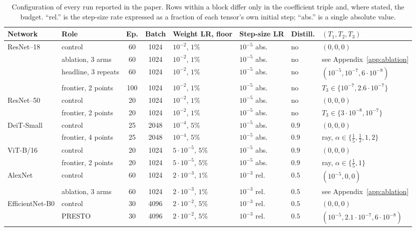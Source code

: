 \documentclass{article}
\begin{document}
\begin{table}[ht]
  \caption{Configuration of every run reported in the paper. Rows within a block
  differ only in the coefficient triple and, where stated, the budget. ``rel.''
  is the step-size rate expressed as a fraction of each tensor's own initial
  step; ``abs.'' is a single absolute value.}
  \label{tab:best-compression-hyperparameters}
  \centering \scriptsize
  \setlength{\tabcolsep}{3pt}\renewcommand{\arraystretch}{1.05}
  \begin{tabular}{llccllll}
    \toprule
    Network & Role & Ep. & Batch & Weight LR, floor & Step-size LR & Distill. & $(T_1,T_2,T_3)$ \\
    \midrule
    \multirow{4}{*}{ResNet--18}
      & control & 60 & 1024 & $10^{-2}$, $1\%$ & $10^{-5}$ abs. & no & $(0,0,0)$ \\
      & ablation, 3 arms & 60 & 1024 & $10^{-2}$, $1\%$ & $10^{-5}$ abs. & no & see Appendix~\ref{app:ablation} \\
      & headline, 3 repeats & 60 & 1024 & $10^{-2}$, $1\%$ & $10^{-5}$ abs. & no & $(10^{-5},10^{-7},6{\cdot}10^{-8})$ \\
      & frontier, 2 points & 100 & 1024 & $10^{-2}$, $1\%$ & $10^{-5}$ abs. & no & $T_3\in\{10^{-7},2.6{\cdot}10^{-7}\}$ \\
    \midrule
    \multirow{2}{*}{ResNet--50}
      & control & 20 & 1024 & $10^{-2}$, $1\%$ & $10^{-5}$ abs. & no & $(0,0,0)$ \\
      & frontier, 2 points & 20 & 1024 & $10^{-2}$, $1\%$ & $10^{-5}$ abs. & no & $T_3\in\{3{\cdot}10^{-8},10^{-7}\}$ \\
    \midrule
    \multirow{2}{*}{DeiT-Small}
      & control & 25 & 2048 & $10^{-4}$, $5\%$ & $10^{-5}$ abs. & $0.9$ & $(0,0,0)$ \\
      & frontier, 4 points & 25 & 2048 & $10^{-4}$, $5\%$ & $10^{-5}$ abs. & $0.9$ & ray, $\alpha\in\{\tfrac15,\tfrac12,1,2\}$ \\
    \midrule
    \multirow{2}{*}{ViT-B/16}
      & control & 20 & 1024 & $5{\cdot}10^{-5}$, $5\%$ & $10^{-5}$ abs. & $0.9$ & $(0,0,0)$ \\
      & frontier, 2 points & 20 & 1024 & $5{\cdot}10^{-5}$, $5\%$ & $10^{-5}$ abs. & $0.9$ & ray, $\alpha\in\{\tfrac15,1\}$ \\
    \midrule
    \multirow{2}{*}{AlexNet}
      & control & 60 & 1024 & $2{\cdot}10^{-3}$, $1\%$ & $10^{-3}$ rel. & $0.5$ & $(10^{-5},0,0)$ \\
      & ablation, 3 arms & 60 & 1024 & $2{\cdot}10^{-3}$, $1\%$ & $10^{-3}$ rel. & $0.5$ & see Appendix~\ref{app:ablation} \\
    \midrule
    \multirow{2}{*}{EfficientNet-B0}
      & control & 30 & 4096 & $2{\cdot}10^{-2}$, $5\%$ & $10^{-3}$ rel. & $0.5$ & $(0,0,0)$ \\
      & PRESTO & 30 & 4096 & $2{\cdot}10^{-2}$, $5\%$ & $10^{-3}$ rel. & $0.5$ & $(10^{-5},2.1{\cdot}10^{-7},6{\cdot}10^{-8})$ \\
    \bottomrule
  \end{tabular}
\end{table}
\end{document}
